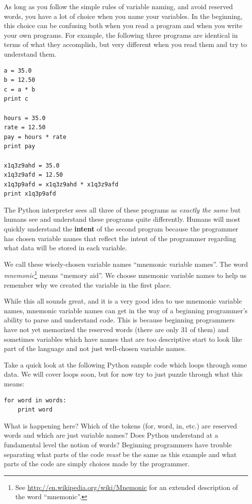 \documentclass[10pt]{book}
\begin{document}

As long as you follow the simple rules of variable naming, and avoid
reserved words, you have a lot of choice when you name your variables.
In the beginning, this choice can be confusing both when you read a 
program and when you write your own programs.  For example, the
following three programs are identical in terms of what they accomplish,
but very different when you read them and try to understand them.

\beforeverb
\begin{verbatim}
a = 35.0
b = 12.50
c = a * b
print c

hours = 35.0
rate = 12.50
pay = hours * rate
print pay

x1q3z9ahd = 35.0
x1q3z9afd = 12.50
x1q3p9afd = x1q3z9ahd * x1q3z9afd
print x1q3p9afd
\end{verbatim}
\afterverb
%
The Python interpreter sees all three of these programs as {\em exactly the 
same} but humans see and understand these programs quite differently.  
Humans will most quickly understand the {\bf intent} 
of the second program because the 
programmer has chosen variable names that reflect the intent of the programmer
regarding what data will be stored in each variable.

We call these wisely-chosen variable names ``mnemonic variable names''.  The
word {\em mnemonic}\footnote{See 
\url{http://en.wikipedia.org/wiki/Mnemonic}
for an extended description of the word ``mnemonic''.} 
means ``memory aid''.
We choose mnemonic variable names to help us remember why we created the variable
in the first place.

While this all sounds great, and it is a very good idea to use mnemonic variable
names, mnemonic variable names can get in the way of a beginning programmer's 
ability to parse and understand code.  This is because beginning programmers 
have not yet memorized the reserved words (there are only 31 of them) and sometimes
variables which have names that are too descriptive start to look like 
part of the language and not just well-chosen variable names.

Take a quick look at the following Python sample code which loops through some data. 
We will cover loops soon, but for now try to just puzzle through what this means:

\beforeverb
\begin{verbatim}
for word in words:
    print word
\end{verbatim}
\afterverb
%
What is happening here?  Which of the tokens (for, word, in, etc.) are reserved words
and which are just variable names?  Does Python understand at a fundamental level 
the notion of words?  Beginning programmers have 
trouble separating what parts of the
code {\em must} be the same as this example and what parts of the code are simply
choices made by the programmer.
\end{document}
